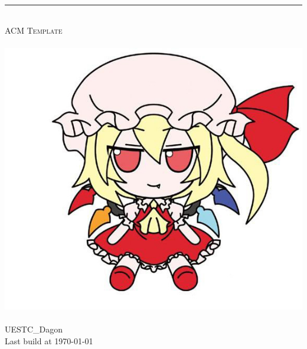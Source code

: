 \begin{titlepage}
	\pagestyle{empty}
	
  \begin{center}
		~\\[80pt]
    \hrule\ \\[8pt]
    \fontsize{48pt}{\baselineskip}\selectfont  \textsc{ACM Template}\\[8pt]
    ~\\[20pt]
    \includegraphics[scale=1]{./cover.jpg}    
    ~\\[20pt]
    \huge UESTC\_Dagon\\[8pt]
    \Large Last build at \today
  \end{center}
\end{titlepage}
\restoregeometry
